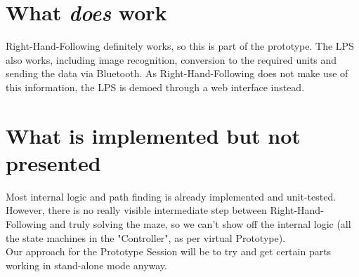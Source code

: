 \documentclass[a4paper,parskip,headheight=38pt]{scrartcl} %
\begin{document}
\section{What \emph{does} work}

Right-Hand-Following definitely works, so this is part of the
prototype.  The LPS also works, including image recognition, conversion
to the required units and sending the data via Bluetooth.  As
Right-Hand-Following does not make use of this information, the LPS is
demoed through a web interface instead.

\section{What is implemented but not presented}

Most internal logic and path finding is already implemented and
unit-tested.  However, there is no really visible intermediate step
between Right-Hand-Following and truly solving the maze, so we can't
show off the internal logic (all the state machines in the
"Controller", as per virtual Prototype).
 \\
Our approach for the Prototype Session will be to try and get certain
parts working in stand-alone mode anyway.
\end{document}
